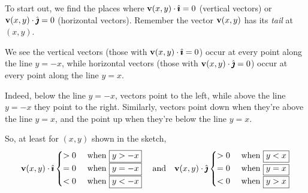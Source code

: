 \begin{solution}
To start out, we find the places where $\mathbf{v}(x,y)\cdot\hat{\pmb{\imath}}=0$ (vertical vectors) or $\mathbf{v}(x,y)\cdot\hat{\pmb{\jmath}}=0$ (horizontal vectors). Remember the vector $\mathbf{v}(x,y)$ has its \emph{tail} at $(x,y)$.

We see the vertical vectors  (those with $\mathbf{v}(x,y)\cdot\hat{\pmb{\imath}}=0$) occur at every point along the line $y=-x$, while 
horizontal vectors  (those with $\mathbf{v}(x,y)\cdot\hat{\pmb{\jmath}}=0$) occur at every point along the line $y=x$.



Indeed, below the line $y=-x$, vectors point to the left, while above the line $y=-x$ they point to the right.
Similarly, vectors point down when they're above the line $y=x$, and the point up when they're below the line $y=x$.

\hfill
{}



So, at least for $(x,y)$ shown in the sketch,
\begin{equation*}
\mathbf{v}(x,y)\cdot \hat{\pmb{\imath}} \begin{cases}
>0 & \mbox{ when } \fbox{$y>-x$}\\
=0 &\mbox{ when } \fbox{$y=-x$}\\
<0&\mbox{ when } \fbox{$y<-x$}
\end{cases} \quad \text{and} \quad
\mathbf{v}(x,y)\cdot \hat{\pmb{\jmath}} \begin{cases}
>0 & \mbox{ when } \fbox{$y<x$}\\
=0 &\mbox{ when } \fbox{$y=x$}\\
<0&\mbox{ when } \fbox{$y>x$}
\end{cases}
\end{equation*}
\end{solution}

